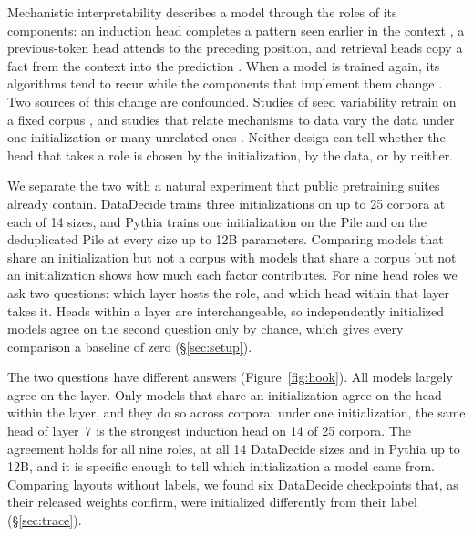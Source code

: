 \documentclass[11pt]{article}
\begin{document}
Mechanistic interpretability describes a model through the roles of its components: an induction head completes a pattern seen earlier in the context \citep{olsson2022context}, a previous-token head attends to the preceding position, and retrieval heads copy a fact from the context into the prediction \citep{wu2025retrieval}.
When a model is trained again, its algorithms tend to recur while the components that implement them change \citep{chughtai2023toy,gurnee2024universal,tigges2024llm,bali2026quantifying}.
Two sources of this change are confounded.
Studies of seed variability retrain on a fixed corpus \citep{sellam2022multiberts,vanderwal2025polypythias,bali2026quantifying}, and studies that relate mechanisms to data vary the data under one initialization or many unrelated ones \citep{chan2022data,singh2024needs,chen2026mechanistic}.
Neither design can tell whether the head that takes a role is chosen by the initialization, by the data, or by neither.

We separate the two with a natural experiment that public pretraining suites already contain.
DataDecide \citep{magnusson2025datadecide} trains three initializations on up to 25 corpora at each of 14 sizes, and Pythia \citep{biderman2023pythia} trains one initialization on the Pile and on the deduplicated Pile at every size up to 12B parameters.
Comparing models that share an initialization but not a corpus with models that share a corpus but not an initialization shows how much each factor contributes.
For nine head roles we ask two questions: which layer hosts the role, and which head within that layer takes it.
Heads within a layer are interchangeable, so independently initialized models agree on the second question only by chance, which gives every comparison a baseline of zero (\S\ref{sec:setup}).

The two questions have different answers (Figure~\ref{fig:hook}).
All models largely agree on the layer.
Only models that share an initialization agree on the head within the layer, and they do so across corpora: under one initialization, the same head of layer~7 is the strongest induction head on 14 of 25 corpora.
The agreement holds for all nine roles, at all 14 DataDecide sizes and in Pythia up to 12B, and it is specific enough to tell which initialization a model came from.
Comparing layouts without labels, we found six DataDecide checkpoints that, as their released weights confirm, were initialized differently from their label (\S\ref{sec:trace}).
\end{document}
